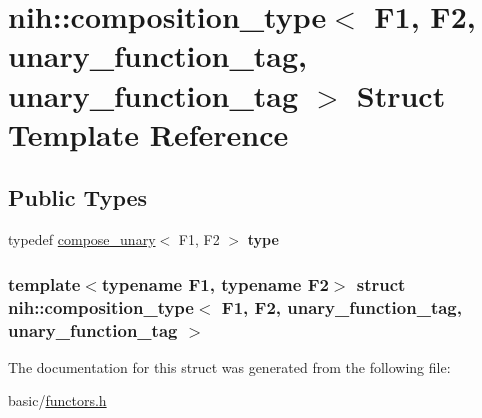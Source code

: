 \hypertarget{structnih_1_1composition__type_3_01_f1_00_01_f2_00_01unary__function__tag_00_01unary__function__tag_01_4}{
\section{nih\-:\-:composition\-\_\-type$<$ \-F1, \-F2, unary\-\_\-function\-\_\-tag, unary\-\_\-function\-\_\-tag $>$ \-Struct \-Template \-Reference}
\label{structnih_1_1composition__type_3_01_f1_00_01_f2_00_01unary__function__tag_00_01unary__function__tag_01_4}
}
\subsection*{\-Public \-Types}
\begin{DoxyCompactItemize}
\item 
\hypertarget{structnih_1_1composition__type_3_01_f1_00_01_f2_00_01unary__function__tag_00_01unary__function__tag_01_4_a6f9fd8242602e25a28e2c0f4b84c972b}{
typedef \hyperlink{structnih_1_1compose__unary}{compose\-\_\-unary}$<$ \-F1, \-F2 $>$ {\bfseries type}}
\label{structnih_1_1composition__type_3_01_f1_00_01_f2_00_01unary__function__tag_00_01unary__function__tag_01_4_a6f9fd8242602e25a28e2c0f4b84c972b}

\end{DoxyCompactItemize}
\subsubsection*{template$<$typename F1, typename F2$>$ struct nih\-::composition\-\_\-type$<$ F1, F2, unary\-\_\-function\-\_\-tag, unary\-\_\-function\-\_\-tag $>$}



\-The documentation for this struct was generated from the following file\-:\begin{DoxyCompactItemize}
\item 
basic/\hyperlink{functors_8h}{functors.\-h}\end{DoxyCompactItemize}
